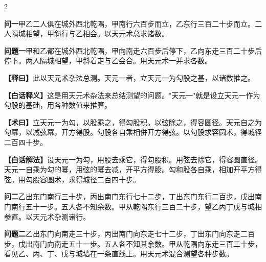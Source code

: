 \documentclass[11pt,a4paper]{article}
\newcommand{\WenQuestion}[1]{\textbf{\textcolor{classicalcolor}{#1}}}
\newcommand{\BaiQuestion}[1]{\textbf{\textcolor{moderncolor}{#1}}}
\newcommand{\WenExplain}{\textcolor{classicalcolor}{\textbf{【释曰】}}}
\newcommand{\BaiExplain}{\textcolor{moderncolor}{\textbf{【白话释义】}}}
\newcommand{\WenMethod}{\textcolor{classicalcolor}{\textbf{【术曰】}}}
\newcommand{\BaiMethod}{\textcolor{moderncolor}{\textbf{【白话解法】}}}
\begin{document}
\begin{paracol}{2}

\switchcolumn*
\begin{tcolorbox}[colback=red!3,colframe=red!30!black,boxrule=0.3pt]
\WenQuestion{问一}\quad 甲乙二人俱在城外西北乾隅，甲南行六百步而立，乙东行三百二十步而立。二人隔城相望，甲斜行与乙相会。以天元术总求诸数。
\end{tcolorbox}
\switchcolumn
\begin{tcolorbox}[colback=blue!3,colframe=blue!30!black,boxrule=0.3pt]
\BaiQuestion{问题一}\quad 甲和乙都在城外西北乾隅，甲向南走六百步后停下，乙向东走三百二十步后停下。两人隔城相望，甲斜着走与乙会合。用天元术一并求各数。
\end{tcolorbox}

\switchcolumn*
\begin{tcolorbox}[colback=red!5,colframe=red!30!black,boxrule=0.3pt]
\WenExplain\quad 此以天元术杂法总测。天元一者，立天元一为勾股之基，以诸数推之。
\end{tcolorbox}
\switchcolumn
\begin{tcolorbox}[colback=blue!5,colframe=blue!30!black,boxrule=0.3pt]
\BaiExplain\quad 这是用天元术杂法来总结测望的问题。"天元一"就是设立天元一作为勾股的基础，用各种数值来推算。
\end{tcolorbox}

\switchcolumn*
\begin{tcolorbox}[colback=red!5,colframe=red!40!black,boxrule=0.3pt]
\WenMethod\quad 立天元一为勾，以股乘之，得勾股积。以弦除之，得容圆径。天元自之为勾冪，以减弦冪，开方得股。勾股各自乘相併开方得弦。以勾股求容圆术，得城径二百四十步。
\end{tcolorbox}
\switchcolumn
\begin{tcolorbox}[colback=blue!5,colframe=blue!40!black,boxrule=0.3pt]
\BaiMethod\quad 设天元一为勾，用股去乘它，得勾股积。用弦去除它，得容圆直径。天元一自乘为勾的幂，用弦的幂去减，开平方得股。勾和股各自乘，相加开平方得弦。用勾股容圆术，求得城径二百四十步。
\end{tcolorbox}

\vspace{0.8em}

\switchcolumn*
\begin{tcolorbox}[colback=red!3,colframe=red!30!black,boxrule=0.3pt]
\WenQuestion{问二}\quad 乙出东门南行三十步，丙出南门东行七十二步，丁出东门东行二百步，戊出南门南行五十一步。五人各不知余数。甲从乾隅东行三百二十步，望乙丙丁戊与城相参直。以天元术杂测诸行。
\end{tcolorbox}
\switchcolumn
\begin{tcolorbox}[colback=blue!3,colframe=blue!30!black,boxrule=0.3pt]
\BaiQuestion{问题二}\quad 乙出东门向南走三十步，丙出南门向东走七十二步，丁出东门向东走二百步，戊出南门向南走五十一步。五人各不知其余数。甲从乾隅向东走三百二十步，看见乙、丙、丁、戊与城墙在一条直线上。用天元术混合测望各种步数。
\end{tcolorbox}


\end{paracol}
\end{document}
